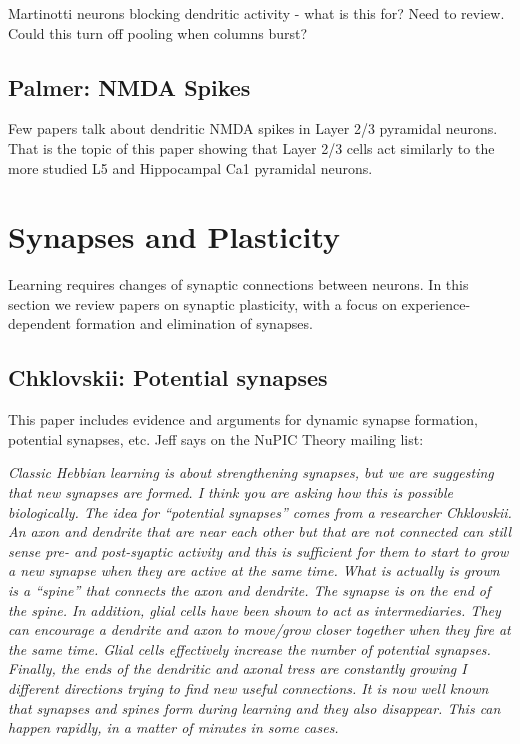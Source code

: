 \documentclass{article} %
\begin{document}
Martinotti neurons blocking dendritic activity - what is this for? Need to
review. Could this turn off pooling when columns burst?


\subsection{Palmer: NMDA Spikes}

Few papers talk about dendritic NMDA spikes in Layer 2/3 pyramidal neurons.
That is the topic of this paper \cite{Palmer2014} showing that Layer 2/3 cells
act similarly to the more studied L5 and Hippocampal Ca1 pyramidal neurons.

\section{Synapses and Plasticity}

Learning requires changes of synaptic connections between neurons. In this
section we review papers on synaptic plasticity, with a focus on
experience-dependent formation and elimination of synapses.

\subsection{Chklovskii: Potential synapses}

This paper \cite{Chklovskii2004} includes evidence and arguments for dynamic
synapse formation,  potential synapses, etc. Jeff says on the NuPIC Theory
mailing list:

\emph{Classic Hebbian learning is about strengthening synapses, but we are
suggesting that new synapses are formed. I think you are asking how this is
possible biologically. The idea for “potential synapses” comes from a researcher
Chklovskii.  An axon and dendrite that are near each other but that are not
connected can still sense pre- and post-syaptic activity and this is sufficient
for them to start to grow a new synapse when they are active at the same time.
What is actually is grown is a “spine” that connects the axon and dendrite.  The
synapse is on the end of the spine.  In addition, glial cells have been shown to
act as intermediaries.  They can encourage a dendrite and axon to move/grow
closer together when they fire at the same time.  Glial cells effectively
increase the number of potential synapses.  Finally, the ends of the dendritic
and axonal tress are constantly growing I different directions trying to find
new useful connections.  It is now well known that synapses and spines form
during learning and they also disappear.  This can happen rapidly, in a matter
of minutes in some cases.}
\end{document}
